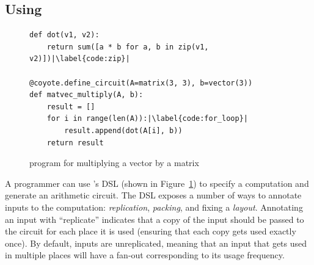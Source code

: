 
\subsection{Using \system}\label{sec:using-coyote}
\begin{figure}
    \small
    \begin{verbatim}
def dot(v1, v2):
    return sum([a * b for a, b in zip(v1, v2)])|\label{code:zip}|
  
@coyote.define_circuit(A=matrix(3, 3), b=vector(3))
def matvec_multiply(A, b):
    result = []
    for i in range(len(A)):|\label{code:for_loop}|
        result.append(dot(A[i], b))
    return result
    \end{verbatim}
    \vspace{-1em}
    \caption{\system program for multiplying a vector by a matrix}\label{fig:coyote-program}
\end{figure}
A programmer can use \system's DSL (shown in Figure~\ref{fig:coyote-program}) to specify a computation and generate an arithmetic circuit. %
The DSL exposes a number of ways to annotate inputs to the computation: {\em replication}, {\em packing}, and fixing a {\em layout}.
Annotating an input with ``replicate'' indicates that a copy of the input should be passed to the circuit for each place it is used (ensuring that each copy gets used exactly once).
By default, inputs are unreplicated, meaning that an input that gets used in multiple places will have a fan-out corresponding to its usage frequency.


